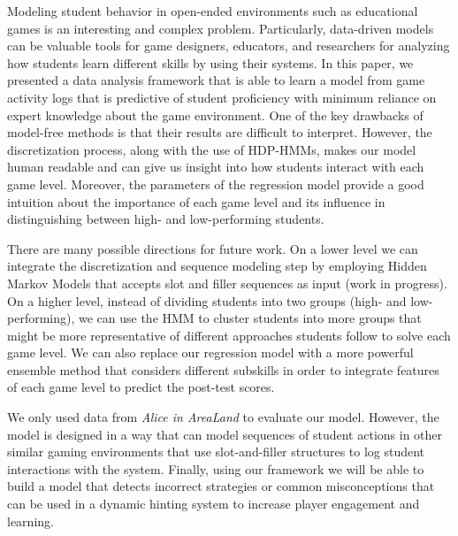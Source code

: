 \documentclass{sigchi}
\begin{document}
	Modeling student behavior in open-ended environments such as educational games is an interesting and complex problem. 
	Particularly, data-driven models can be valuable tools for game designers, educators, and researchers for analyzing how students learn different skills by using their systems.
	In this paper, we presented a data analysis framework that is able to learn a model from game activity logs that is predictive of student proficiency with minimum reliance on expert knowledge about the game environment. 
	One of the key drawbacks of model-free methods is that their results are difficult to interpret. 
	However, the discretization process, along with the use of HDP-HMMs, makes our model human readable and can give us insight into how students interact with each game level.
	Moreover, the parameters of the regression model provide a good intuition about the importance of each game level and its influence in distinguishing between high- and low-performing students.
	
	There are many possible directions for future work. On a lower level we can integrate the discretization and sequence modeling step by employing Hidden Markov Models that accepts slot and filler sequences as input (work in progress). On a higher level, instead of dividing students into two groups (high- and low-performing), we can use the HMM to cluster students \cite{bicego2003similarity,smyth1997clustering} into more groups that might be  more representative of different approaches students follow to solve each game level. We can also replace our regression model with a more powerful ensemble method that considers different subskills in order to integrate features of each game level to predict the post-test scores.
	
	We only used data from \textit{Alice in AreaLand} to evaluate our model. However, the model is designed in a way that can model sequences of student actions in other similar gaming environments that use slot-and-filler structures to log student interactions with the system. Finally, using our framework we will be able to build a model that detects incorrect strategies or common misconceptions that can be used in a dynamic hinting system to increase player engagement and learning.
	\newline
	
	\balance
	
	
\end{document}
